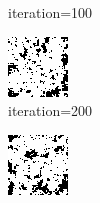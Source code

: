 \documentclass{article}
\begin{document}
\begin{figure}[h]
\begin{subfigure}[t]{0.18\textwidth}
\vspace{-0.6cm}
\caption{iteration=100}
\end{subfigure}\hspace{0.01\textwidth}
\begin{subfigure}[t]{0.18\textwidth}
\centering
\includegraphics[width=\textwidth]{./computational/results/gibbs_node_sampler_positive_iter_200.png}
\vspace{-0.6cm}
\caption{iteration=200}
\end{subfigure}\hspace{0.01\textwidth}
\begin{subfigure}[t]{0.18\textwidth}
\centering
\includegraphics[width=\textwidth]{./computational/results/gibbs_node_sampler_positive_iter_300.png}

\end{subfigure}
\end{figure}
\end{document}
